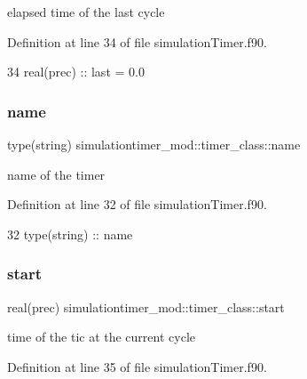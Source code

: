 elapsed time of the last cycle 



Definition at line 34 of file simulation\+Timer.\+f90.


\begin{DoxyCode}
34         \textcolor{keywordtype}{real(prec)} :: last = 0.0
\end{DoxyCode}
\mbox{\label{structsimulationtimer__mod_1_1timer__class_aa9021f130f1ff4431ce394e38cea3ac1}} 
\subsubsection{\texorpdfstring{name}{name}}
{\footnotesize\ttfamily type(string) simulationtimer\+\_\+mod\+::timer\+\_\+class\+::name\hspace{0.3cm}{\ttfamily [private]}}



name of the timer 



Definition at line 32 of file simulation\+Timer.\+f90.


\begin{DoxyCode}
32         \textcolor{keywordtype}{type}(string) :: name
\end{DoxyCode}
\mbox{\label{structsimulationtimer__mod_1_1timer__class_ad61018be29f7e3ac5ecfa6b2d068e581}} 
\subsubsection{\texorpdfstring{start}{start}}
{\footnotesize\ttfamily real(prec) simulationtimer\+\_\+mod\+::timer\+\_\+class\+::start\hspace{0.3cm}{\ttfamily [private]}}



time of the tic at the current cycle 



Definition at line 35 of file simulation\+Timer.\+f90.


